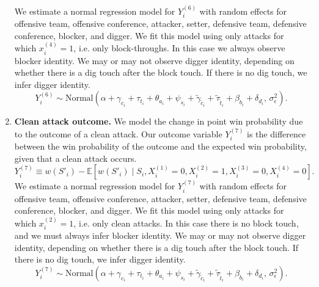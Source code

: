 \documentclass[USenglish]{article}
\theoremstyle{dgthm}
\theoremstyle{dgdef}
\begin{document}
\begin{enumerate}
\begin{equation*}
        \end{equation*}
        We estimate a normal regression model for $Y_i^{(6)}$ with random effects for offensive team, offensive conference, attacker, setter, defensive team, defensive conference, blocker, and digger. We fit this model using only attacks for which $x_i^{(4)} = 1$, i.e. only block-throughs. In this case we always observe blocker identity. We may or may not observe digger identity, depending on whether there is a dig touch after the block touch. If there is no dig touch, we infer digger identity.
        \begin{equation}
        \label{eqn:attack-model-6}
            Y_i^{(6)} \sim \mbox{Normal}\left(
                \alpha + \gamma_{c_i} + \tau_{t_i} + \theta_{a_i} + \psi_{s_i} + \tilde\gamma_{\tilde c_i} + \tilde\tau_{\tilde t_i} + \beta_{b_i} + \delta_{d_i},\,
                \sigma^2_\epsilon
            \right).
        \end{equation}
    \item
        {\bf Clean attack outcome.} We model the change in point win probability due to the outcome of a clean attack. Our outcome variable $Y_i^{(7)}$ is the difference between the win probability of the outcome and the expected win probability, given that a clean attack occurs.
        \begin{equation*}
            Y_i^{(7)} \equiv w(S'_i) - \mathbb{E}\left[w(S'_i) \mid S_i, X_i^{(1)} = 0, X_i^{(2)} = 1, X_i^{(3)} = 0, X_i^{(4)} = 0\right].
        \end{equation*}
        We estimate a normal regression model for $Y_i^{(7)}$ with random effects for offensive team, offensive conference, attacker, setter, defensive team, defensive conference, blocker, and digger. We fit this model using only attacks for which $x_i^{(2)} = 1$, i.e. only clean attacks. In this case there is no block touch, and we must always infer blocker identity. We may or may not observe digger identity, depending on whether there is a dig touch after the block touch. If there is no dig touch, we infer digger identity.
        \begin{equation}
        \label{eqn:attack-model-7}
            Y_i^{(7)} \sim \mbox{Normal}\left(
                \alpha + \gamma_{c_i} + \tau_{t_i} + \theta_{a_i} + \psi_{s_i} + \tilde\gamma_{\tilde c_i} + \tilde\tau_{\tilde t_i} + \beta_{b_i} + \delta_{d_i},\,
                \sigma^2_\epsilon
            \right).
        \end{equation}
\end{enumerate}
\end{document}
